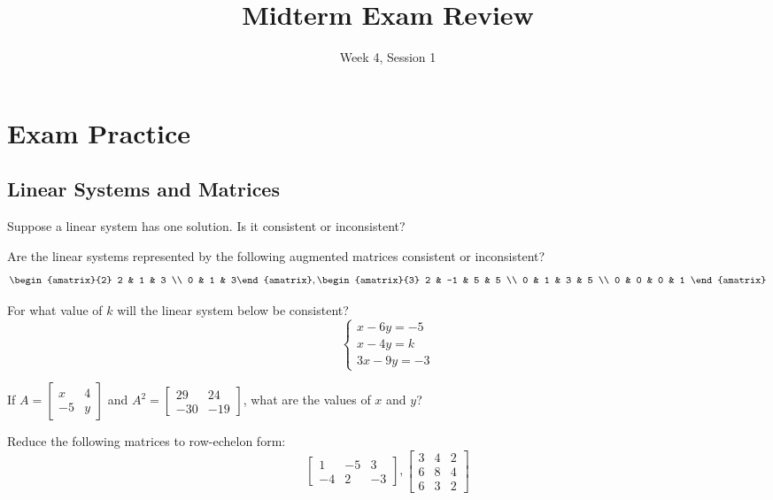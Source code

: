 \documentclass[11pt]{exam}
\title{Midterm Exam Review}
\date{Week 4, Session 1}
\begin{document}
\maketitle

\section{Exam Practice}
    
    \vspace{20px}
    \subsection{Linear Systems and Matrices}
    \begin{questions}
        \item Suppose a linear system has one solution. Is it consistent or inconsistent?
        \item Are the linear systems represented by the following augmented matrices consistent or inconsistent?
        $$\begin{amatrix}{2} 2 & 1 & 3 \\ 0 & 1 & 3\end{amatrix},
          \begin{amatrix}{3} 2 & -1 & 5 & 5 \\ 0 & 1 & 3 & 5 \\ 0 & 0 & 0 & 1 \end{amatrix}$$
        \item For what value of $k$ will the linear system below be consistent?
        $$\begin{cases} x - 6y = -5 \\ x - 4y = k \\ 3x - 9y = -3 \end{cases}$$
        \item If $A = \begin{bmatrix} x & 4 \\ -5 & y \end{bmatrix}$ and $A^2 = \begin{bmatrix} 29 & 24 \\ -30 & -19 \end{bmatrix}$,
        what are the values of $x$ and $y$?
        \item Reduce the following matrices to row-echelon form:
        $$\begin{bmatrix} 1 & -5 & 3 \\ -4 & 2 & -3 \end{bmatrix},
          \begin{bmatrix} 3 & 4 & 2 \\ 6 & 8 & 4 \\ 6 & 3 & 2 \end{bmatrix}$$
    \end{questions}
\end{document}
